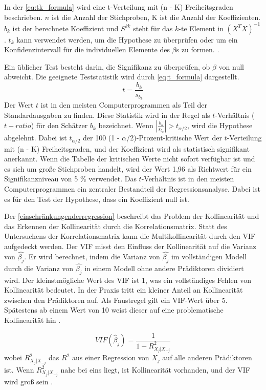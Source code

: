 In der \autoref{eq:tk_formula} wird eine t-Verteilung mit (n - K) Freiheitsgraden beschrieben. \(n\) ist die Anzahl der Stichproben, K ist die Anzahl der Koeffizienten. \(b_k\) ist der berechnete Koeffizient und $S^{kk}$ steht für das \(k\)-te Element in \((X^TX)^{-1}\). \(t_k\) kann verwendet werden, um die Hypothese zu überprüfen oder um ein Konfidenzintervall für die individuellen Elemente des $\beta$s zu formen.  \cite{greene2003econometric}.\par
Ein üblicher Test besteht darin, die Signifikanz zu überprüfen, ob $\beta$ von null abweicht. Die geeignete Teststatistik wird durch \autoref{eq:t_formula} dargestellt. 
\begin{equation}
t = \frac{b_k}{s_{b_k}}
\label{eq:t_formula}
\end{equation}
Der Wert \(t\) ist in den meisten Computerprogrammen als Teil der Standardausgaben zu finden. Diese Statistik wird in der Regel als \(t\)-Verhältnis (\(t-ratio\)) für den Schätzer \(b_k\) bezeichnet. Wenn \( \left|\frac{b_k}{s_{b_k}}\right| > t_{\alpha/2} \), wird die Hypothese abgelehnt. Dabei ist \( t_{\alpha/2} \) der 100 (1 - \(\alpha\)/2)-Prozent-kritische Wert der \(t\)-Verteilung mit (n - K) Freiheitsgraden, und der Koeffizient wird als statistisch signifikant anerkannt. Wenn die Tabelle der kritischen Werte nicht sofort verfügbar ist und es sich um große Stichproben handelt, wird der Wert 1,96 als Richtwert für ein Signifikanzniveau von 5 \% verwendet. Das \(t\)-Verhältnis ist in den meisten Computerprogrammen ein zentraler Bestandteil der Regressionsanalyse. Dabei ist es für den Test der Hypothese, dass ein Koeffizient null ist. \par
Der \autoref{einschränkungenderregression} beschreibt das Problem der Kollinearität und das Erkennen der Kollinearität durch die Korrelationsmatrix. Statt des Untersuchens der Korrelationsmatrix kann die Multikollinearität durch den \ac{VIF} aufgedeckt werden. Der \ac{VIF} misst den Einfluss der Kollinearität auf die Varianz von $\hat{\beta_j}$. Er wird berechnet, indem die Varianz von $\hat{\beta_j}$ im vollständigen Modell durch die Varianz von $\hat{\beta_j}$ in einem Modell ohne andere Prädiktoren dividiert wird. Der kleinstmögliche Wert des \ac{VIF} ist 1, was ein vollständiges Fehlen von Kollinearität bedeutet. In der Praxis tritt ein kleiner Anteil an Kollinearität zwischen den Prädiktoren auf. Als Faustregel gilt ein \ac{VIF}-Wert über 5. Spätestens ab einem Wert von 10 weist dieser auf eine problematische Kollinearität hin \cite{james2013introduction}. \par
\begin{equation}
VIF(\hat{\beta}_j) = \frac{1}{1 - R^2_{X_j|X_{-j}}}
\label{vif}
\end{equation}
wobei \( R^2_{X_j|X_{-j}} \) das \( R^2 \) aus einer Regression von \( X_j \) auf alle anderen Prädiktoren ist. Wenn \( R^2_{X_j|X_{-j}} \) nahe bei eins liegt, ist Kollinearität vorhanden, und der VIF wird groß sein \cite{james2013introduction}.\par
